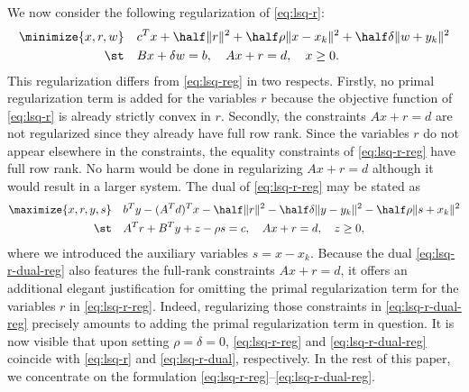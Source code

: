 \documentclass{amsart}
\begin{document}
We now consider the following regularization of \eqref{eq:lsq-r}:
\begin{equation}
  \label{eq:lsq-r-reg}
  \begin{aligned}
    \minimize{x, r, w} \quad &
      c^T x + \half \|r\|^2 +
      \half \rho \|x - x_k\|^2 +
      \half \delta \|w + y_k\|^2 \\
    \st \quad &
      Bx + \delta w = b, \quad Ax + r = d, \quad x \geq 0.
  \end{aligned}
\end{equation}
This regularization differs from \eqref{eq:lsq-reg} in two respects. Firstly,
no primal regularization term is added for the variables $r$ because the
objective function of \eqref{eq:lsq-r} is already strictly convex in $r$.
Secondly, the constraints $Ax + r = d$ are not regularized since they already
have full row rank. Since the variables $r$ do not appear elsewhere in the
constraints, the equality constraints of \eqref{eq:lsq-r-reg} have full row
rank. No harm would be done in regularizing $Ax + r = d$ although it would
result in a larger system. The dual of \eqref{eq:lsq-r-reg} may be stated as
\begin{equation}
  \label{eq:lsq-r-dual-reg}
  \begin{aligned}
    \maximize{x, r, y, s} \quad &
      b^T y - (A^T d)^T x - \half \|r\|^2 -
      \half \delta \|y - y_k\|^2 -
      \half \rho \|s + x_k\|^2 \\
    \st \quad &
      A^T r + B^T y + z - \rho s = c, \quad
      Ax + r = d, \quad
      z \geq 0,
  \end{aligned}
\end{equation}
where we introduced the auxiliary variables $s = x - x_k$. Because the dual
\eqref{eq:lsq-r-dual-reg} also features the full-rank constraints $Ax + r = d$,
it offers an additional elegant justification for omitting the primal
regularization term for the variables $r$ in \eqref{eq:lsq-r-reg}. Indeed,
regularizing those constraints in \eqref{eq:lsq-r-dual-reg} precisely amounts
to adding the primal regularization term in question. It is now visible that
upon setting $\rho = \delta = 0$, \eqref{eq:lsq-r-reg} and
\eqref{eq:lsq-r-dual-reg} coincide with \eqref{eq:lsq-r} and
\eqref{eq:lsq-r-dual}, respectively. In the rest of this paper, we concentrate
on the formulation \eqref{eq:lsq-r-reg}--\eqref{eq:lsq-r-dual-reg}.
\end{document}
